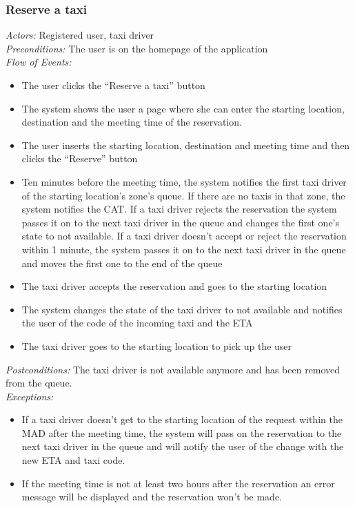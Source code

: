 \documentclass{article}
\begin{document}
\subsubsection{Reserve a taxi}
\textit{Actors:} Registered user, taxi driver
\\\textit{Preconditions:} The user is on the homepage of the application 
\\\textit{Flow of Events:}
\begin{itemize}
	\item  The user clicks the ``Reserve a taxi'' button
	\item  The system shows the user a page where she can enter the starting location, destination and the meeting time of the reservation.
	\item  The user inserts the starting location, destination and meeting time and then clicks the ``Reserve'' button
	\item  Ten minutes before the meeting time, the system notifies the first taxi driver of the starting location's zone's queue. If there are no taxis in that zone, the system notifies the CAT\@. If a taxi driver rejects the reservation the system passes it on to the next taxi driver in the queue and changes the first one's state to not available. If a taxi driver doesn't accept or reject the reservation within 1 minute, the system passes it on to the next taxi driver in the queue and moves the first one to the end of the queue
	\item  The taxi driver accepts the reservation and goes to the starting location
	\item  The system changes the state of the taxi driver to not available and notifies the user of the code of the incoming taxi and the ETA
	\item  The taxi driver goes to the starting location to pick up the user
\end{itemize}
\textit{Postconditions:} The taxi driver is not available anymore and has been removed from the queue.
\\\textit{Exceptions:}
\begin{itemize} 
	\item If a taxi driver doesn't get to the starting location of the request within the MAD after the meeting time, the system will pass on the reservation to the next taxi driver in the queue and will notify the user of the change with the new ETA and taxi code.
	\item If the meeting time is not at least two hours after the reservation an error message will be displayed and the reservation won't be made.
\end{itemize}
\end{document}
